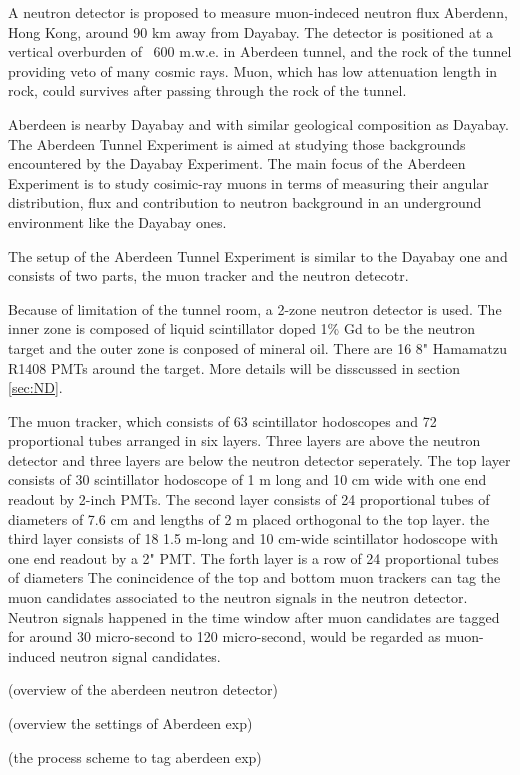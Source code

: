 
A neutron detector is proposed to measure muon-indeced neutron flux Aberdenn, Hong Kong,
around 90 km away from Dayabay.
The detector is positioned at a vertical overburden of ~600 m.w.e. in Aberdeen tunnel, and the rock of the tunnel
providing veto of many cosmic rays. Muon, which has low attenuation length in rock, could
survives after passing through the rock of the tunnel.

Aberdeen is nearby Dayabay and with similar geological composition as Dayabay.
The Aberdeen Tunnel Experiment is aimed at studying those backgrounds encountered by the Dayabay
Experiment. The main focus of the Aberdeen Experiment is to study cosimic-ray muons in terms
of measuring their angular distribution, flux and contribution to neutron background in an
underground environment like the Dayabay ones.

The setup of the Aberdeen Tunnel Experiment is similar to the Dayabay one and consists of
two parts, the muon tracker and the neutron detecotr.

Because of limitation of the tunnel room, a 2-zone neutron detector is used. The inner zone
is composed of liquid scintillator doped 1\% Gd to be the neutron target and 
the outer zone is conposed of mineral oil. There are 16 8" Hamamatzu R1408 PMTs around the target.
More details will be disscussed in section \ref{sec:ND}.

The muon tracker, which consists of 63 scintillator hodoscopes and 72 proportional
tubes arranged in six layers.
Three layers are above the neutron detector and three layers are below the neutron detector seperately.
The top layer consists of 30 scintillator hodoscope of 1 m long and 10 cm wide with
one end readout by 2-inch PMTs. The second layer consists of 24 proportional tubes of diameters of
7.6 cm and lengths of 2 m placed orthogonal to the top layer. the third layer consists of 18 1.5 m-long
and 10 cm-wide scintillator hodoscope with one end readout by a 2" PMT. The forth layer is a row
of 24 proportional tubes of diameters
The conincidence of the top and bottom muon trackers can tag the muon candidates
associated to the neutron signals in the neutron detector. Neutron signals happened
in the time window after muon candidates are tagged for around 30 micro-second to
120 micro-second, would be regarded as muon-induced neutron signal candidates.




(overview of the aberdeen neutron detector)


(overview the settings of Aberdeen exp)

(the process scheme to tag aberdeen exp)
